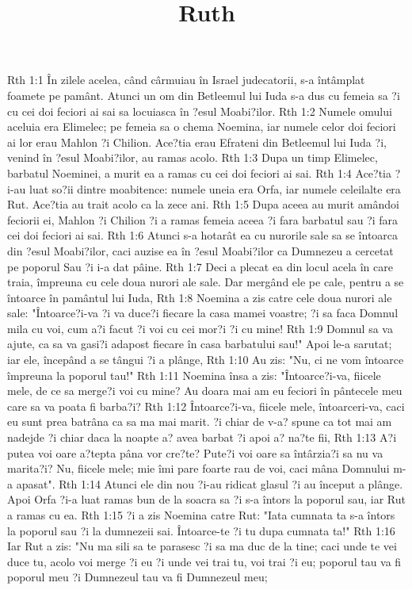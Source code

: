 

\title{Ruth}

Rth 1:1  În zilele acelea, când cârmuiau în Israel judecatorii, s-a întâmplat foamete pe pamânt. Atunci un om din Betleemul lui Iuda s-a dus cu femeia sa ?i cu cei doi feciori ai sai sa locuiasca în ?esul Moabi?ilor.
Rth 1:2  Numele omului aceluia era Elimelec; pe femeia sa o chema Noemina, iar numele celor doi feciori ai lor erau Mahlon ?i Chilion. Ace?tia erau Efrateni din Betleemul lui Iuda ?i, venind în ?esul Moabi?ilor, au ramas acolo.
Rth 1:3  Dupa un timp Elimelec, barbatul Noeminei, a murit ea a ramas cu cei doi feciori ai sai.
Rth 1:4  Ace?tia ?i-au luat so?ii dintre moabitence: numele uneia era Orfa, iar numele celeilalte era Rut. Ace?tia au trait acolo ca la zece ani.
Rth 1:5  Dupa aceea au murit amândoi feciorii ei, Mahlon ?i Chilion ?i a ramas femeia aceea ?i fara barbatul sau ?i fara cei doi feciori ai sai.
Rth 1:6  Atunci s-a hotarât ea cu nurorile sale sa se întoarca din ?esul Moabi?ilor, caci auzise ea în ?esul Moabi?ilor ca Dumnezeu a cercetat pe poporul Sau ?i i-a dat pâine.
Rth 1:7  Deci a plecat ea din locul acela în care traia, împreuna cu cele doua nurori ale sale. Dar mergând ele pe cale, pentru a se întoarce în pamântul lui Iuda,
Rth 1:8  Noemina a zis catre cele doua nurori ale sale: "Întoarce?i-va ?i va duce?i fiecare la casa mamei voastre; ?i sa faca Domnul mila cu voi, cum a?i facut ?i voi cu cei mor?i ?i cu mine!
Rth 1:9  Domnul sa va ajute, ca sa va gasi?i adapost fiecare în casa barbatului sau!" Apoi le-a sarutat; iar ele, începând a se tângui ?i a plânge,
Rth 1:10  Au zis: "Nu, ci ne vom întoarce împreuna la poporul tau!"
Rth 1:11  Noemina însa a zis: "Întoarce?i-va, fiicele mele, de ce sa merge?i voi cu mine? Au doara mai am eu feciori în pântecele meu care sa va poata fi barba?i?
Rth 1:12  Întoarce?i-va, fiicele mele, întoarceri-va, caci eu sunt prea batrâna ca sa ma mai marit. ?i chiar de v-a? spune ca tot mai am nadejde ?i chiar daca la noapte a? avea barbat ?i apoi a? na?te fii,
Rth 1:13  A?i putea voi oare a?tepta pâna vor cre?te? Pute?i voi oare sa întârzia?i sa nu va marita?i? Nu, fiicele mele; mie îmi pare foarte rau de voi, caci mâna Domnului m-a apasat".
Rth 1:14  Atunci ele din nou ?i-au ridicat glasul ?i au început a plânge. Apoi Orfa ?i-a luat ramas bun de la soacra sa ?i s-a întors la poporul sau, iar Rut a ramas cu ea.
Rth 1:15  ?i a zis Noemina catre Rut: "Iata cumnata ta s-a întors la poporul sau ?i la dumnezeii sai. Întoarce-te ?i tu dupa cumnata ta!"
Rth 1:16  Iar Rut a zis: "Nu ma sili sa te parasesc ?i sa ma duc de la tine; caci unde te vei duce tu, acolo voi merge ?i eu ?i unde vei trai tu, voi trai ?i eu; poporul tau va fi poporul meu ?i Dumnezeul tau va fi Dumnezeul meu;
